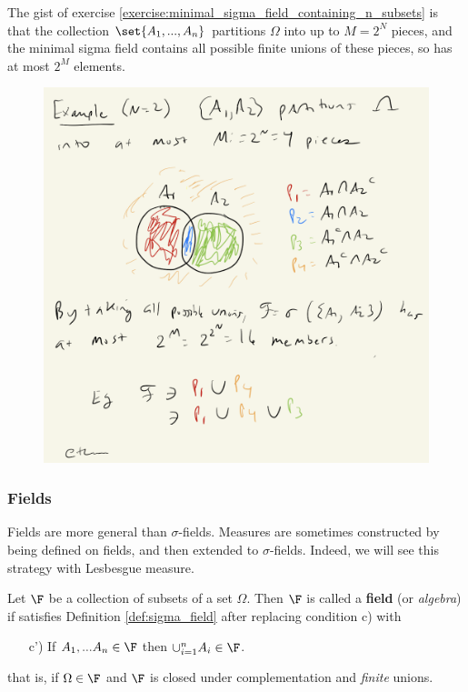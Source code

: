 \documentclass{article} %
\newcommand{\sfs}{$\sigma$-fields}
\begin{document}
\begin{remark}
The gist of exercise \ref{exercise:minimal_sigma_field_containing_n_subsets} is that the collection $\set{A_1,...,A_n}$ partitions $\Omega$ into up to $M=2^N$ pieces, and the minimal sigma field contains all possible finite unions of these pieces, so has at most $2^{M}$ elements.
  
\begin{figure}[h!]
\centering 
\includegraphics[width=.7\textwidth]{images/minimal_sigma_fields}
\end{figure}

\end{remark}

\subsubsection{Fields}

Fields are more general than $\sigma$-fields.  Measures are sometimes constructed by being defined on fields, and then extended to \sfs.  Indeed, we will see this strategy with Lesbesgue measure. 

\begin{definition}
Let $\F$ be a collection of subsets of a set $\Omega$.  Then $\F$ is called a \textbf{field} (or \textit{algebra})  if satisfies Definition \ref{def:sigma_field} after replacing condition c) with

\begin{enumerate}
	\item[c')] If $A_1,...A_n \in \F$ then $\cup_{i=1}^n A_i \in \F$.
\end{enumerate}
that is, if $\Omega \in \F$ and $\F$ is closed under complementation and \textit{finite} unions.
\label{def:field}	
\end{definition}
\end{document}
